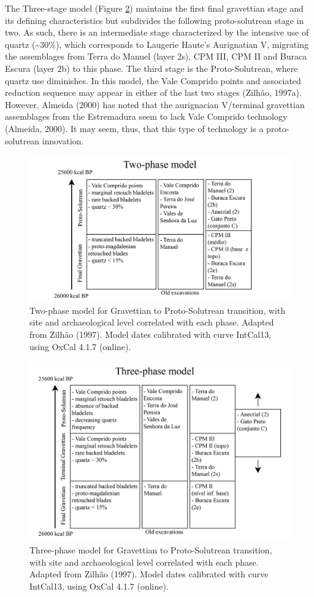 \documentclass[12pt,twoside]{reedthesis}
\begin{document}
The Three-stage model (Figure \ref{fig:threephase}) maintains the first final gravettian stage and its defining characteristics but subdivides the following proto-solutrean stage in two. As such, there is an intermediate stage characterized by the intensive use of quartz (\textasciitilde30\%), which corresponds to Laugerie Haute's Aurignatian V, migrating the assemblages from Terra do Manuel (layer 2s), CPM III, CPM II and Buraca Escura (layer 2b) to this phase. The third stage is the Proto-Solutrean, where quartz use diminishes. In this model, the Vale Comprido points and associated reduction sequence may appear in either of the last two stages (Zilhão, 1997a). However, Almeida (2000) has noted that the aurignacian V/terminal gravettian assemblages from the Estremadura seem to lack Vale Comprido technology (Almeida, 2000). It may seem, thus, that this type of technology is a proto-solutrean innovation.
\begin{figure}[H]

{\centering \includegraphics[width=0.7\linewidth]{figure/Two-phasemodel} 

}

\caption{Two-phase model for Gravettian to Proto-Solutrean transition, with site and archaeological level correlated with each phase. Adapted from Zilhão (1997). Model dates calibrated with curve IntCal13, using OxCal 4.1.7 (online).}\label{fig:twophase}
\end{figure}
\begin{figure}[H]

{\centering \includegraphics[width=0.7\linewidth]{figure/Three-phasemodel} 

}

\caption{Three-phase model for Gravettian to Proto-Solutrean transition, with site and archaeological level correlated with each phase. Adapted from Zilhão (1997). Model dates calibrated with curve IntCal13, using OxCal 4.1.7 (online).}\label{fig:threephase}
\end{figure}
~
\end{document}
